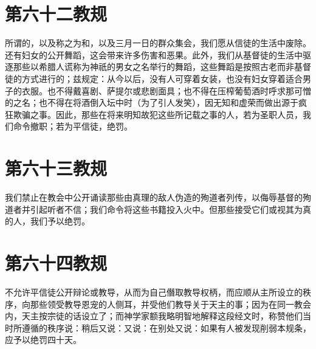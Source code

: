 
\section{第六十二教规}

所谓的，以及称之为和，以及三月一日的群众集会，我们愿从信徒的生活中废除。还有妇女的公开舞蹈，这会带来许多伤害和恶果。此外，我们从基督徒的生活中驱逐那些以希腊人谎称为神祇的男女之名举行的舞蹈，这些舞蹈是按照古老而非基督徒的方式进行的；兹规定：从今以后，没有人可穿着女装，也没有妇女穿着适合男子的衣服。也不得戴喜剧、萨提尔或悲剧面具；也不得在压榨葡萄酒时呼求那可憎的之名；也不得在将酒倒入坛中时（为了引人发笑），因无知和虚荣而做出源于疯狂欺骗之事。因此，那些在将来明知故犯这些所记载之事的人，若为圣职人员，我们命令撤职；若为平信徒，绝罚。\par


\section{第六十三教规}

我们禁止在教会中公开诵读那些由真理的敌人伪造的殉道者列传，以侮辱基督的殉道者并引起听者不信；我们命令将这些书籍投入火中。但那些接受它们或视其为真的人，我们予以绝罚。\par


\section{第六十四教规}

不允许平信徒公开辩论或教导，从而为自己僭取教导权柄，而应顺从主所设立的秩序，向那些领受教导恩宠的人侧耳，并受他们教导关于天主的事；因为在同一教会内，天主按宗徒的话设立了；而神学家额我略明智地解释这段经文时，称赞他们当时所遵循的秩序说：稍后又说：又说：在别处又说：如果有人被发现削弱本规条，应予以绝罚四十天。\par

